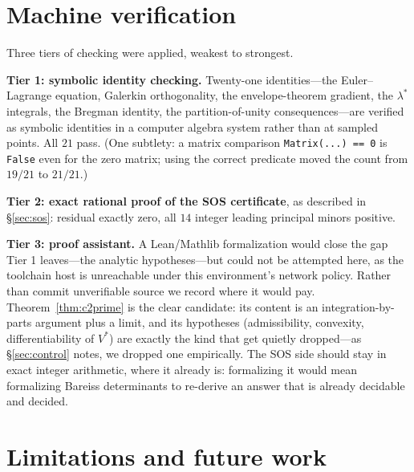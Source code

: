 \documentclass[11pt]{article}
\theoremstyle{plain}
\theoremstyle{definition}
\begin{document}
\section{Machine verification}
\label{sec:verification}

Three tiers of checking were applied, weakest to strongest.

\textbf{Tier 1: symbolic identity checking.} Twenty-one identities---the
Euler--Lagrange equation, Galerkin orthogonality, the envelope-theorem gradient,
the $\lambda^{*}$ integrals, the Bregman identity, the partition-of-unity
consequences---are verified as symbolic identities in a computer algebra system
rather than at sampled points. All $21$ pass. (One subtlety: a matrix comparison
\texttt{Matrix(...) == 0} is \texttt{False} even for the zero matrix; using the
correct predicate moved the count from $19/21$ to $21/21$.)

\textbf{Tier 2: exact rational proof of the SOS certificate}, as described in
\S\ref{sec:sos}: residual exactly zero, all $14$ integer leading principal
minors positive.

\textbf{Tier 3: proof assistant.} A Lean/Mathlib formalization would close the
gap Tier 1 leaves---the analytic hypotheses---but could not be attempted here,
as the toolchain host is unreachable under this environment's network policy.
Rather than commit unverifiable source we record where it would pay.
Theorem~\ref{thm:c2prime} is the clear candidate: its content is an
integration-by-parts argument plus a limit, and its hypotheses (admissibility,
convexity, differentiability of $V^{*}$) are exactly the kind that get quietly
dropped---as \S\ref{sec:control} notes, we dropped one empirically. The SOS side
should stay in exact integer arithmetic, where it already is: formalizing it
would mean formalizing Bareiss determinants to re-derive an answer that is
already decidable and decided.

\section{Limitations and future work}
\end{document}
